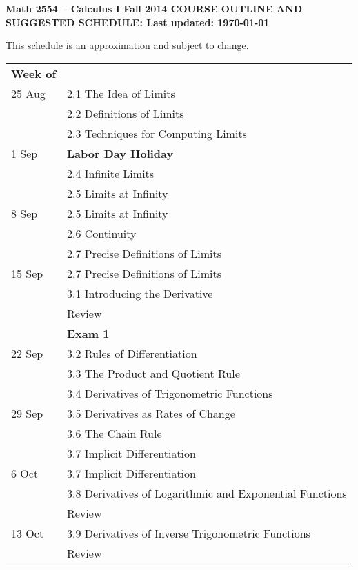 \documentclass[margin,line,pifont,palatino,courier]{article}
\begin{document}
\begin{center}
{\bf Math 2554 -- Calculus I \hspace{0.4\textwidth} Fall 2014 \vspace{0.1in} \newline
COURSE OUTLINE AND SUGGESTED SCHEDULE:
\newline
{\small Last updated: \today}}
\end{center}

This schedule is an approximation and subject to change.

\vspace{.2in}
\begin{supertabular}{ll}
{\bf Week of} & \\ 
25 Aug & 2.1 The Idea of Limits \\
 & 2.2 Definitions of Limits \\
 & 2.3 Techniques for Computing Limits \\
1 Sep & {\bf Labor Day Holiday} \\
 & 2.4 Infinite Limits \\
 & 2.5 Limits at Infinity \\
8 Sep & 2.5 Limits at Infinity \\
 & 2.6 Continuity \\
 & 2.7 Precise Definitions of Limits \\
15 Sep & 2.7 Precise Definitions of Limits \\
 & 3.1 Introducing the Derivative \\
 & Review \\
 & {\bf Exam 1} \\
22 Sep & 3.2 Rules of Differentiation \\
 & 3.3 The Product and Quotient Rule \\
 & 3.4 Derivatives of Trigonometric Functions \\
29 Sep & 3.5 Derivatives as Rates of Change \\
 & 3.6 The Chain Rule \\
 & 3.7 Implicit Differentiation \\
6 Oct & 3.7 Implicit Differentiation \\
 & 3.8 Derivatives of Logarithmic and Exponential Functions \\
 & Review \\
13 Oct & 3.9 Derivatives of Inverse Trigonometric Functions \\
 & Review \\

\end{supertabular}
\end{document}
